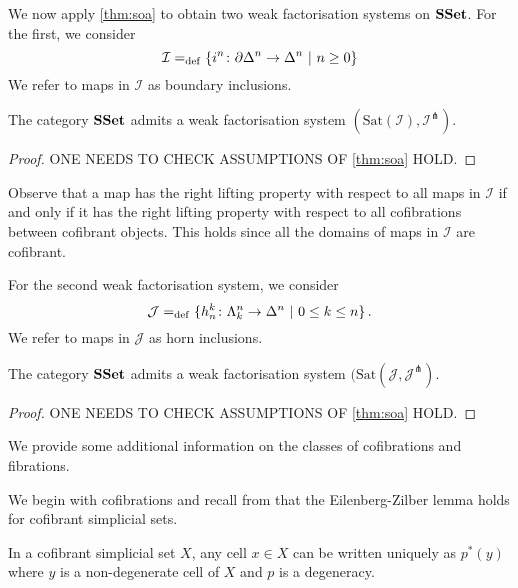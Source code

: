 \documentclass[reqno,10pt,a4paper,oneside,draft]{amsart}
\begin{document}
\bigskip




We now apply \cref{thm:soa} to obtain two weak factorisation systems on $\mathbf{SSet}$. For the first, 
we consider 
\[
\mathcal{I} =_{\operatorname{def}} \{ i^{n} \colon  \partial \Delta^{n} \to \Delta^{n} \ | \ n \geq 0 \}
\]
We refer to maps in $\mathcal{I}$ as boundary inclusions. 

\begin{proposition} The category $\mathbf{SSet}$ admits a weak factorisation system $(\mathrm{Sat}(\mathcal{I}), 
\mathcal{I}^\pitchfork)$.
\end{proposition}

\begin{proof} ONE NEEDS TO CHECK ASSUMPTIONS OF \cref{thm:soa} HOLD.
\end{proof}



Observe that  a map has the right lifting property with respect to all maps in $\mathcal{I}$
if and only if it has the right lifting property with respect to all cofibrations between cofibrant
objects. This holds since all the domains of maps in $\mathcal{I}$ are cofibrant.

\bigskip


For the second weak factorisation system, we consider 
\[
\mathcal{J} =_{\operatorname{def}} \{ h^k_n  \colon \Lambda^n_k \to \Delta^{n} \ | \ 0 \leq k \leq n \} \, .
\]
We refer to maps in $\mathcal{J}$ as horn inclusions.

\begin{proposition} The category $\mathbf{SSet}$ admits a weak factorisation system $(\mathrm{Sat}(\mathcal{J}, 
\mathcal{J}^\pitchfork)$.
\end{proposition}

\begin{proof} ONE NEEDS TO CHECK ASSUMPTIONS OF \cref{thm:soa} HOLD.
\end{proof}




We provide some additional information on the classes of cofibrations and fibrations. 

\bigskip

We begin with cofibrations and recall from  that the Eilenberg-Zilber lemma holds for cofibrant simplicial sets.

\begin{lemma}
\label{lem:EZ_cof}
In a cofibrant simplicial set $X$, any cell $x \in X$ can be written uniquely as $p^*(y)$ where $y$ is a non-degenerate cell of $X$ and $p$ is a degeneracy.
\end{lemma}
\end{document}
